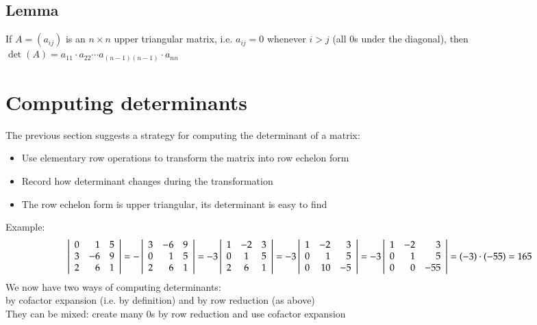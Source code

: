 \documentclass{article}[18pt]
\begin{document}
\subsection{Lemma}
If $A=(a_{ij})$ is an $n\times n$ upper triangular matrix, i.e. $a_{ij}=0$ whenever $i>j$ (all 0s under the diagonal), then $\operatorname { det } ( A ) = a _ { 11 } \cdot a _ { 22 } \cdots a _ { ( n - 1 ) ( n - 1 ) } \cdot a _ { n n }$
\section{Computing determinants}
The previous section suggests a strategy for computing the determinant of a matrix:
\begin{itemize}
	\item Use elementary row operations to transform the matrix into row echelon form
	\item Record how determinant changes during the transformation
	\item The row echelon form is upper triangular, its determinant is easy to find
\end{itemize}
Example:
$$\left| \begin{array} { r r r } { 0 } & { 1 } & { 5 } \\ { 3 } & { - 6 } & { 9 } \\ { 2 } & { 6 } & { 1 } \end{array} \right| = - \left| \begin{array} { r r r } { 3 } & { - 6 } & { 9 } \\ { 0 } & { 1 } & { 5 } \\ { 2 } & { 6 } & { 1 } \end{array} \right| = - 3 \left| \begin{array} { c c c } { 1 } & { - 2 } & { 3 } \\ { 0 } & { 1 } & { 5 } \\ { 2 } & { 6 } & { 1 } \end{array} \right| =- 3 \left| \begin{array} { r r r } { 1 } & { - 2 } & { 3 } \\ { 0 } & { 1 } & { 5 } \\ { 0 } & { 10 } & { - 5 } \end{array} \right| = - 3 \left| \begin{array} { r r r } { 1 } & { - 2 } & { 3 } \\ { 0 } & { 1 } & { 5 } \\ { 0 } & { 0 } & { - 55 } \end{array} \right| = ( - 3 ) \cdot ( - 55 ) = 165$$
We now have two ways of computing determinants:\\
by cofactor expansion (i.e. by definition) and by row reduction (as above)\\
They can be mixed: create many 0s by row reduction and use cofactor expansion
\end{document}

